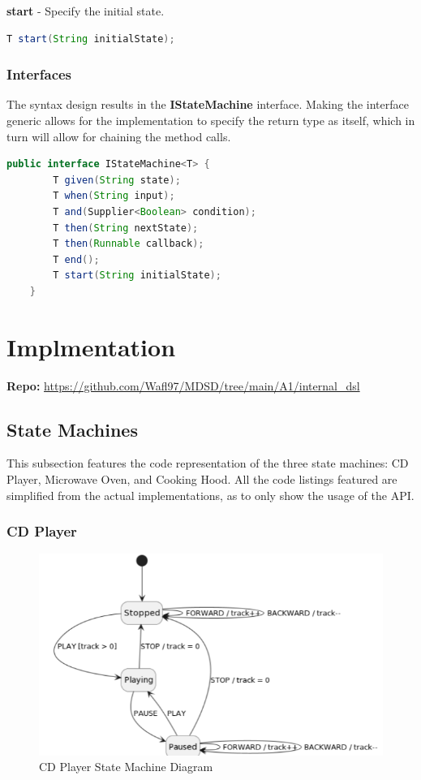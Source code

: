 \documentclass{article}
\begin{document}
\textbf{start} - Specify the initial state.
\begin{lstlisting}[language=java]
    T start(String initialState);
\end{lstlisting}

\subsubsection{Interfaces}

The syntax design results in the \textbf{IStateMachine} interface. Making the interface generic allows for the implementation to specify the return type as itself, which in turn will allow for chaining the method calls.

\begin{lstlisting}[language=java, caption={State Machine Interface}, captionpos=b]
    public interface IStateMachine<T> {
        T given(String state);
        T when(String input);
        T and(Supplier<Boolean> condition);
        T then(String nextState);
        T then(Runnable callback);
        T end();
        T start(String initialState);
    }
\end{lstlisting}

\section{Implmentation}

\textbf{Repo:} \url{https://github.com/Wafl97/MDSD/tree/main/A1/internal_dsl}



\subsection{State Machines}

This subsection features the code representation of the three state machines: CD Player, Microwave Oven, and Cooking Hood. All the code listings featured are simplified from the actual implementations, as to only show the usage of the API.

\subsubsection{CD Player}

\begin{figure}[H]
    \centering
    \includegraphics[scale=.75]{./figures/player.PNG}
    \caption{CD Player State Machine Diagram}
\end{figure}
\end{document}

